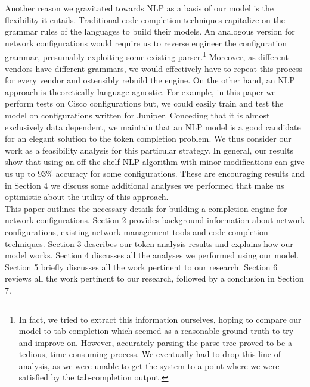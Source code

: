 Another reason we gravitated towards NLP as a basis of our model is the flexibility it entails. Traditional code-completion techniques capitalize on the grammar rules of the languages to build their models. An analogous version for network configurations would require us to reverse engineer the configuration grammar, presumably exploiting some existing parser.\footnote{In fact, we tried to extract this information ourselves, hoping to compare our model to tab-completion which seemed as a reasonable ground truth to try and improve on. However, accurately parsing the parse tree proved to be a tedious, time consuming process. We eventually had to drop this line of analysis, as we were unable to get the system to a point where we were satisfied by the tab-completion output.}
Moreover, as different vendors have different grammars, we would effectively have to repeat this process for every vendor and ostensibly rebuild the engine. On the other hand, an NLP approach is theoretically language agnostic. For example, in this paper we perform tests on Cisco configurations but, we could easily train and test the model on configurations written for Juniper. Conceding that it is almost exclusively data dependent, we maintain that an NLP model is a good candidate for an elegant solution to the token completion problem. We thus consider our work as a feasibility analysis for this particular strategy. In general, our results show that using an off-the-shelf NLP algorithm with minor modifications can give us up to 93\% accuracy for some configurations. These are encouraging results and in Section 4 we discuss some additional analyses we performed that make us optimistic about the utility of this approach.\\

This paper outlines the necessary details for building a completion engine for network configurations. Section 2 provides background information about network configurations, existing network management tools and code completion techniques. Section 3 describes our token analysis results and explains how our model works. Section 4 discusses all the analyses we performed using our model. Section 5 briefly discusses all the work pertinent to our research. Section 6 reviews all the work pertinent to our research, followed by a conclusion in Section 7.


